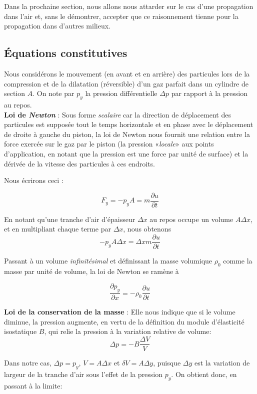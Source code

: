 Dans la prochaine section, nous allons nous attarder sur le cas d'une propagation dans l'air et, sans le démontrer, accepter que ce raisonnement tienne pour la propagation dans 
d'autres milieux.

\subsection{Équations constitutives} 

Nous considérons le mouvement (en avant et en arrière) des particules  lors de la compression et de la dilatation (réversible) d'un gaz parfait dans un cylindre de section $A$. On note par $p_{y}$ la pression différentielle $\Delta p$ par rapport à la pression au repos.\\

\textbf{Loi de \textit{Newton}} : Sous forme \textit{scalaire} car la direction de déplacement des particules est supposée tout le temps horizontale et en phase avec le déplacement
de droite à gauche du piston, la loi de Newton nous fournit une relation entre la force exercée sur le gaz par le piston (la pression «\textit{locale}» aux points d'application, en notant que la pression est une force par unité de surface) et la dérivée de la vitesse des particules à ces endroits.

Nous écrirons ceci : 

$$F_{y} = -p_{y} A = m \frac{\partial{u}}{\partial t}$$ 

En notant qu'une tranche d'air d'épaisseur $\Delta x$  au repos occupe un volume $A\Delta x$, et en multipliant chaque terme par $\Delta x$, nous obtenons 
$$-p_{y} A\Delta x = \Delta x m \frac{\partial{u}}{\partial t}$$ 

Passant à  un volume \textit{infinitésimal} et définissant la masse volumique 
$\rho_{0}$ comme la masse par unité de volume, la loi de Newton se ramène à

\[\frac{\partial p_{y}}{\partial x} = - \rho_{0} \frac{\partial{u}}{\partial t}\]


\textbf{Loi de la conservation de la masse}  : Elle nous indique que si le volume diminue, la pression augmente, en vertu de la définition du module d'élasticité isostatique $B$, qui relie la pression à la variation relative de volume:
\[\Delta p  = - B \frac{\Delta V}{V} \]

Dans notre cas, $\Delta p = p_y$, $V = A \Delta x$ et $\delta V = A \Delta y$, puisque $\Delta y$ est la variation de largeur de la tranche d'air sous l'effet de la pression $p_y$. On obtient donc, en passant à la limite:

